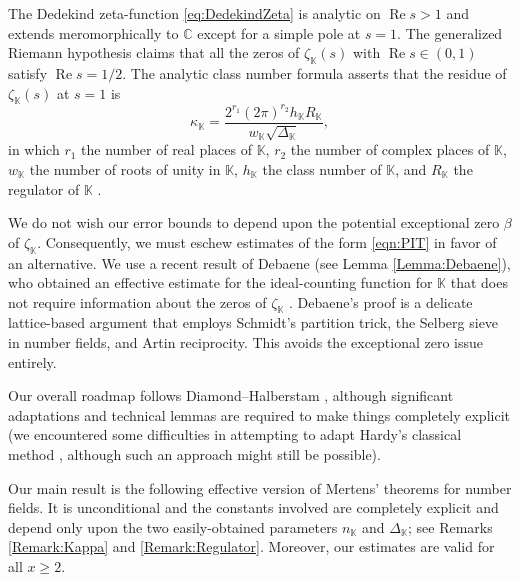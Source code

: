 \documentclass[10pt,reqno]{amsart}
\theoremstyle{plain}
\theoremstyle{definition}
\newcommand{\K}{\mathbb{K}}
\newcommand{\C}{\mathbb{C}}
\renewcommand{\Re}{\operatorname{Re}}
\begin{document}
The Dedekind zeta-function \eqref{eq:DedekindZeta}
is analytic on $\Re s > 1$ and extends meromorphically to $\C$ except for a simple pole at $s=1$. 
The generalized Riemann hypothesis claims that all the zeros of 
$\zeta_{\K}(s)$ with $\Re s \in (0,1)$ satisfy $\Re s = 1/2$.
The analytic class number formula asserts
that the residue of $\zeta_{\K}(s)$ at $s=1$ is
\begin{equation}\label{eqn:residue_class_ana_form}
\kappa_{\K} = \frac{2^{r_1}(2\pi)^{r_2}h_{\K}R_{\K}}{w_{\K}\sqrt{\Delta_{\K}}},
\end{equation}
in which $r_1$ the number of real places of $\K$, $r_2$ the number of complex places of $\K$,
$w_{\K}$ the number of roots of unity in $\K$,
$h_{\K}$ the class number of $\K$, and $R_{\K}$ the regulator of $\K$ \cite{Lang}.


We do not wish our error bounds to depend upon the potential exceptional zero $\beta$
of $\zeta_{\K}$.  Consequently, we must eschew estimates of the form \eqref{eqn:PIT} in favor
of an alternative.  We use a recent result of  Debaene (see Lemma \ref{Lemma:Debaene}), who obtained an effective estimate for the
ideal-counting function for $\K$ that does not require information about the zeros of $\zeta_{\K}$ \cite[Cor.~2]{Debaene}. Debaene's proof is a delicate lattice-based argument that employs Schmidt's partition trick, the Selberg sieve in number fields, and Artin reciprocity.  This avoids the exceptional zero issue entirely.

Our overall roadmap follows Diamond--Halberstam \cite[p.~128-9]{DiamondHalberstam}, 
although significant adaptations and technical lemmas are required to make things completely explicit
(we encountered some difficulties in attempting to adapt Hardy's classical method \cite{HardyNote1927,HardyNote2935,BardestaniFreiberg}, although such an approach might still be possible).

Our main result is the following effective version of Mertens' theorems for number fields.
It is unconditional and the constants involved are completely explicit and depend only upon the two
easily-obtained parameters $n_{\K}$ and $\Delta_{\K}$;
see Remarks \ref{Remark:Kappa} and \ref{Remark:Regulator}.
Moreover, our estimates are valid for all $x \geq 2$.
\end{document}
